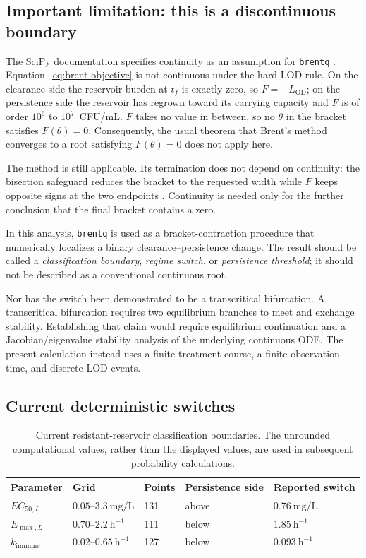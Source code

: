 \documentclass[11pt]{article}
\newcommand{\EC}{EC_{50,L}}
\newcommand{\EM}{E_{\max,L}}
\newcommand{\KI}{k_{\mathrm{immune}}}
\newcommand{\LOD}{L_{\mathrm{OD}}}
\begin{document}
\subsection{Important limitation: this is a discontinuous boundary}

The SciPy documentation specifies continuity as an assumption for
\texttt{brentq} \cite{scipyBrentq}. Equation~\eqref{eq:brent-objective} is
not continuous under the hard-LOD rule. On the clearance side the reservoir
burden at $t_f$ is exactly zero, so $F=-\LOD$; on the persistence side the
reservoir has regrown toward its carrying capacity and $F$ is of order $10^{6}$
to $10^{7}$~CFU/mL. $F$ takes no value in between, so no $\theta$ in the bracket
satisfies $F(\theta)=0$. Consequently, the usual theorem that Brent's method
converges to a root satisfying $F(\theta)=0$ does not apply here.

The method is still applicable. Its termination does not depend on
continuity: the bisection safeguard reduces the bracket to the requested
width while $F$ keeps opposite signs at the two endpoints
\cite{Brent1971,brent1973}. Continuity is needed only for the further
conclusion that the final bracket contains a zero.

In this analysis, \texttt{brentq} is used as a bracket-contraction procedure
that numerically localizes a binary clearance--persistence change. The result
should be called a \emph{classification boundary}, \emph{regime switch}, or
\emph{persistence threshold}; it should not be described as a conventional
continuous root.

Nor has the switch been demonstrated to be a transcritical bifurcation. A
transcritical bifurcation requires two equilibrium branches to meet and
exchange stability. Establishing that claim would require equilibrium
continuation and a Jacobian/eigenvalue stability analysis of the underlying
continuous ODE. The present calculation instead uses a finite treatment
course, a finite observation time, and discrete LOD events.

\subsection{Current deterministic switches}

\begin{table}[htbp]
\centering
\small
\begin{tabular}{@{}lllll@{}}
\toprule
Parameter & Grid & Points & Persistence side & Reported switch \\
\midrule
$\EC$ & $0.05$--$3.3~\mathrm{mg/L}$ & 131 & above & $0.76~\mathrm{mg/L}$ \\
$\EM$ & $0.70$--$2.2~\mathrm{h}^{-1}$ & 111 & below & $1.85~\mathrm{h}^{-1}$ \\
$\KI$ & $0.02$--$0.65~\mathrm{h}^{-1}$ & 127 & below & $0.093~\mathrm{h}^{-1}$ \\
\bottomrule
\end{tabular}
\caption{Current resistant-reservoir classification boundaries. The unrounded
computational values, rather than the displayed values, are used in subsequent
probability calculations.}
\label{tab:switches}
\end{table}
\end{document}
